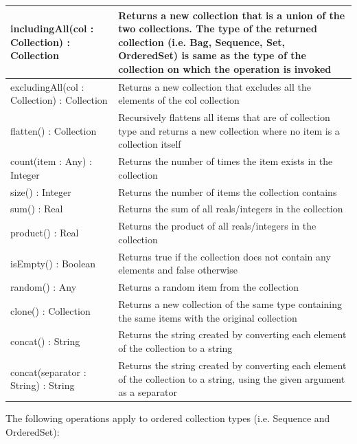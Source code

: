 \begin{longtabu} {|p{6.5cm}|X|}
			includingAll(col : Collection) : Collection & Returns a new collection that is a union of the two collections. The type of the returned collection (i.e. Bag, Sequence, Set, OrderedSet) is same as the type of the collection on which the operation is invoked \\\hline
			
			excludingAll(col : Collection) : Collection & Returns a new collection that excludes all the elements of the col collection \\\hline
			
			flatten() : Collection & Recursively flattens all items that are of collection type and returns a new collection where no item is a collection itself \\\hline
			
			count(item : Any) : Integer & Returns the number of times the item exists in the collection \\\hline
			
			size() : Integer & Returns the number of items the collection contains \\\hline

			sum() : Real & Returns the sum of all reals/integers in the collection\\\hline

			product() : Real & Returns the product of all reals/integers in the collection\\\hline
			
			isEmpty() : Boolean & Returns true if the collection does not contain any elements and false otherwise \\\hline
	
			random() : Any & Returns a random item from the collection \\\hline
			
			clone() : Collection & Returns a new collection of the same type containing the same items with the original collection \\\hline
			
			concat() : String & Returns the string created by converting each element of the collection to a string \\\hline
			
			concat(separator : String) : String & Returns the string created by converting each element of the collection to a string, using the given argument as a separator \\\hline
\end{longtabu}

The following operations apply to ordered collection types (i.e. Sequence and OrderedSet):

